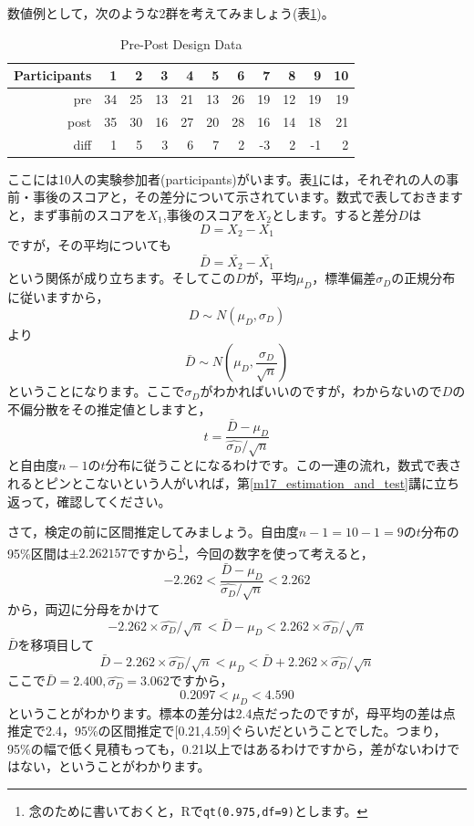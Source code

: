 \documentclass{ltjsarticle}
\begin{document}
数値例として，次のような2群を考えてみましょう(表\ref{tbl19::01})。
\begin{table}[ht]
	\centering
	\caption{Pre-Post Design Data}
	\begin{tabular}{rrrrrrrrrrr}
		\hline
		Participants & 1  & 2  & 3  & 4  & 5  & 6  & 7  & 8  & 9  & 10 \\
		\hline
		pre          & 34 & 25 & 13 & 21 & 13 & 26 & 19 & 12 & 19 & 19 \\
		post         & 35 & 30 & 16 & 27 & 20 & 28 & 16 & 14 & 18 & 21 \\ \hline
		diff         & 1  & 5  & 3  & 6  & 7  & 2  & -3 & 2  & -1 & 2  \\
		\hline
	\end{tabular}
	\label{tbl19::01}
\end{table}
ここには10人の実験参加者(participants)がいます。表\ref{tbl19::01}には，それぞれの人の事前・事後のスコアと，その差分について示されています。数式で表しておきますと，まず事前のスコアを$X_1$,事後のスコアを$X_2$とします。すると差分$D$は
\[ D = X_2 - X_1 \]
ですが，その平均についても
\[ \bar{D} = \bar{X_2} - \bar{X_1} \]
という関係が成り立ちます。そしてこの$D$が，平均$\mu_D$，標準偏差$\sigma_D$の正規分布に従いますから，
\[ D \sim N(\mu_D,\sigma_D)\]
より
\[ \bar{D} \sim N(\mu_D,\frac{\sigma_D}{\sqrt{n}}) \]
ということになります。ここで$\sigma_D$がわかればいいのですが，わからないので$D$の不偏分散をその推定値としますと，
\[ t = \frac{\bar{D}-\mu_D}{\hat{\sigma_D}/\sqrt{n}} \]
と自由度$n-1$の$t$分布に従うことになるわけです。この一連の流れ，数式で表されるとピンとこないという人がいれば，第\ref{m17_estimation_and_test}講に立ち返って，確認してください。

さて，検定の前に区間推定してみましょう。自由度$n-1=10-1=9$の$t$分布の95\%区間は$\pm 2.262157$ですから\footnote{念のために書いておくと，Rで\texttt{qt(0.975,df=9)}とします。}，今回の数字を使って考えると，
\[ -2.262 < \frac{\bar{D}-\mu_D}{\hat{\sigma_D}/\sqrt{n}} < 2.262 \]
から，両辺に分母をかけて
\[ -2.262 \times \hat{\sigma_D}/\sqrt{n} < \bar{D}-\mu_D < 2.262 \times \hat{\sigma_D}/\sqrt{n} \]
$\bar{D}$を移項目して
\[ \bar{D}-2.262 \times \hat{\sigma_D}/\sqrt{n} < \mu_D < \bar{D}+2.262\times \hat{\sigma_D}/\sqrt{n} \]
ここで$\bar{D} = 2.400,\hat{\sigma_D} = 3.062$ですから，
\[ 0.2097 < \mu_D < 4.590 \]
ということがわかります。標本の差分は2.4点だったのですが，母平均の差は点推定で2.4，95\%の区間推定で[0.21,4.59]ぐらいだということでした。つまり，95\%の幅で低く見積もっても，0.21以上ではあるわけですから，差がないわけではない，ということがわかります。
\end{document}
